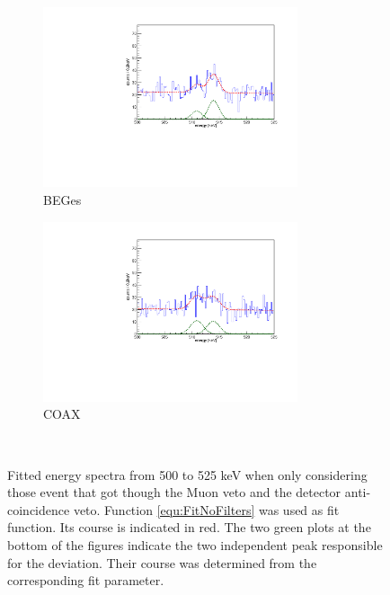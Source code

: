 \documentclass[encoding=utf8,british]{tumphthesis}
\begin{document}
\begin{figure}[t!]
	\centering
	\begin{subfigure}{.5\textwidth}
		\centering
		\includegraphics[width=75mm]{./Bilder/500525FitNoFilterBEGes.pdf}
		\caption{BEGes}
		\label{fig:FitNoFilterBEGes}
	\end{subfigure}\hfill%
	\begin{subfigure}{.5\textwidth}
		\centering
		\includegraphics[width=75mm]{./Bilder/500525FitNoFilterCOAX.pdf}
		\caption{COAX}
		\label{fig:FitNoFilterCOAX}
	\end{subfigure}
    \\
	\caption{
		Fitted energy spectra from 500 to 525 keV when only considering those event that got though the Muon veto and the detector anti-coincidence veto. 
		Function \ref{equ:FitNoFilters} was used as fit function. Its course is indicated in red. 
		The two green plots at the bottom of the figures indicate the two independent peak responsible for the deviation. 
		Their course was determined from the corresponding fit parameter.
		}
\end{figure}
\\
\end{document}
